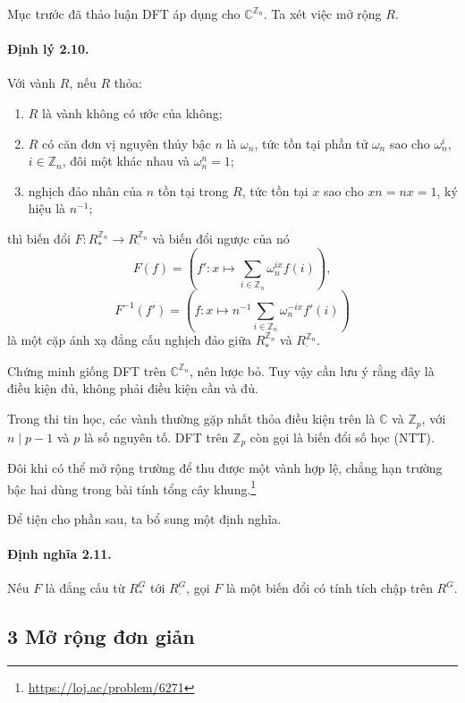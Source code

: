 \documentclass[11pt]{article}
\begin{document}
Mục trước đã thảo luận DFT áp dụng cho \(\mathbb C^{\mathbb Z_n}\). Ta xét việc
mở rộng \(R\).

\paragraph{Định lý 2.10.}
Với vành \(R\), nếu \(R\) thỏa:
\begin{enumerate}
  \item \(R\) là vành không có ước của không;
  \item \(R\) có căn đơn vị nguyên thủy bậc \(n\) là \(\omega_n\), tức tồn tại
  phần tử \(\omega_n\) sao cho \(\omega_n^i\), \(i\in\mathbb Z_n\), đôi một khác
  nhau và \(\omega_n^n=1\);
  \item nghịch đảo nhân của \(n\) tồn tại trong \(R\), tức tồn tại \(x\) sao cho
  \(xn=nx=1\), ký hiệu là \(n^{-1}\);
\end{enumerate}
thì biến đổi \(F:R^{\mathbb Z_n}_*\to R^{\mathbb Z_n}_{\cdot}\) và biến đổi
ngược của nó
\[
  F(f)=\left(f':x\mapsto \sum_{i\in\mathbb Z_n}\omega_n^{ix}f(i)\right),
\]
\[
  F^{-1}(f')=
  \left(f:x\mapsto n^{-1}\sum_{i\in\mathbb Z_n}\omega_n^{-ix}f'(i)\right)
\]
là một cặp ánh xạ đẳng cấu nghịch đảo giữa \(R^{\mathbb Z_n}_*\) và
\(R^{\mathbb Z_n}_{\cdot}\).

Chứng minh giống DFT trên \(\mathbb C^{\mathbb Z_n}\), nên lược bỏ. Tuy vậy cần
lưu ý rằng đây là điều kiện đủ, không phải điều kiện cần và đủ.

Trong thi tin học, các vành thường gặp nhất thỏa điều kiện trên là \(\mathbb C\)
và \(\mathbb Z_p\), với \(n\mid p-1\) và \(p\) là số nguyên tố. DFT trên
\(\mathbb Z_p\) còn gọi là biến đổi số học (NTT).

Đôi khi có thể mở rộng trường để thu được một vành hợp lệ, chẳng hạn trường bậc
hai dùng trong bài tính tổng cây khung.\footnote{\url{https://loj.ac/problem/6271}}

Để tiện cho phần sau, ta bổ sung một định nghĩa.

\paragraph{Định nghĩa 2.11.}
Nếu \(F\) là đẳng cấu từ \(R^G_*\) tới \(R^G_{\cdot}\), gọi \(F\) là một biến đổi
có tính tích chập trên \(R^G\).

\subsection*{3 Mở rộng đơn giản}
\end{document}
